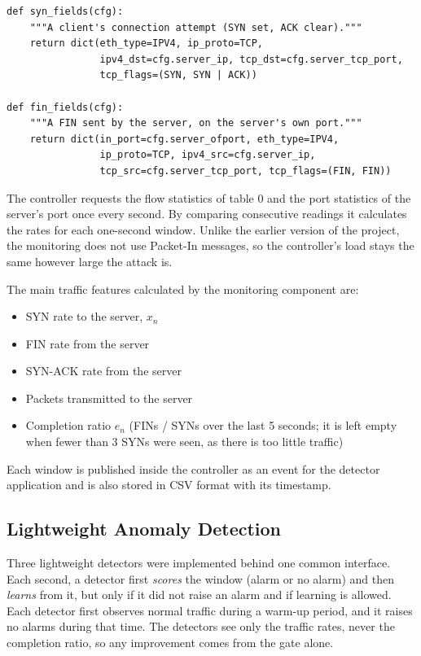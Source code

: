 \documentclass[12pt,a4paper]{article}
\begin{document}
\begin{lstlisting}[caption={Matches for the SYN and FIN Counting Rules}]
def syn_fields(cfg):
    """A client's connection attempt (SYN set, ACK clear)."""
    return dict(eth_type=IPV4, ip_proto=TCP,
                ipv4_dst=cfg.server_ip, tcp_dst=cfg.server_tcp_port,
                tcp_flags=(SYN, SYN | ACK))

def fin_fields(cfg):
    """A FIN sent by the server, on the server's own port."""
    return dict(in_port=cfg.server_ofport, eth_type=IPV4,
                ip_proto=TCP, ipv4_src=cfg.server_ip,
                tcp_src=cfg.server_tcp_port, tcp_flags=(FIN, FIN))
\end{lstlisting}

The controller requests the flow statistics of table 0 and the port statistics
of the server's port once every second. By comparing consecutive readings it
calculates the rates for each one-second window. Unlike the earlier version of
the project, the monitoring does not use Packet-In messages, so the controller's
load stays the same however large the attack is.

The main traffic features calculated by the monitoring component are:
\begin{itemize}
  \item SYN rate to the server, $x_n$
  \item FIN rate from the server
  \item SYN-ACK rate from the server
  \item Packets transmitted to the server
  \item Completion ratio $e_n$ (FINs / SYNs over the last 5 seconds; it is left
  empty when fewer than 3 SYNs were seen, as there is too little traffic)
\end{itemize}
Each window is published inside the controller as an event for the detector
application and is also stored in CSV format with its timestamp.

\subsection{Lightweight Anomaly Detection}
Three lightweight detectors were implemented behind one common interface. Each
second, a detector first \emph{scores} the window (alarm or no alarm) and then
\emph{learns} from it, but only if it did not raise an alarm and if learning is
allowed. Each detector first observes normal traffic during a warm-up period,
and it raises no alarms during that time. The detectors see only the traffic
rates, never the completion ratio, so any improvement comes from the gate alone.
\end{document}
